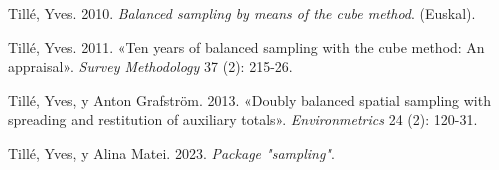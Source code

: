\documentclass[
  spanish,
  a4paper,
]{scrreprt}
\newlength{\cslhangindent}
\newenvironment{CSLReferences}[2] %
 {\begin{list}{}{%
  \setlength{\itemindent}{0pt}
  \setlength{\leftmargin}{0pt}
  \setlength{\parsep}{0pt}
  \ifodd #1
   \setlength{\leftmargin}{\cslhangindent}
   \setlength{\itemindent}{-1\cslhangindent}
  \fi
  \setlength{\itemsep}{#2\baselineskip}}}
 {\end{list}}
\begin{document}
\begin{CSLReferences}{1}{1}
Tillé, Yves. 2010. \emph{Balanced sampling by means of the cube method}.
(Euskal).

Tillé, Yves. 2011. {«Ten years of balanced sampling with the cube
method: An appraisal»}. \emph{Survey Methodology} 37 (2): 215-26.

Tillé, Yves, y Anton Grafström. 2013. {«Doubly balanced spatial sampling
with spreading and restitution of auxiliary totals»}.
\emph{Environmetrics} 24 (2): 120-31.

Tillé, Yves, y Alina Matei. 2023. \emph{Package {"}sampling{"}}.

\end{CSLReferences}
\end{document}
